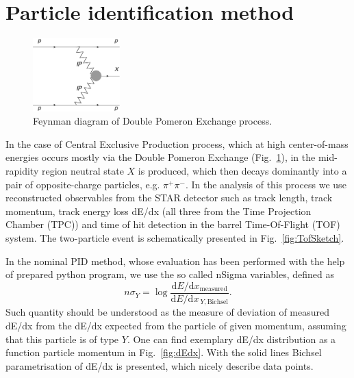 \documentclass[a4paper,11pt]{article}
\begin{document}
\section{Particle identification method}
\begin{figure}[ht]
  \centering
  \includegraphics[width=0.3\textwidth]{graphics/DPE.pdf}
  \caption{Feynman diagram of Double Pomeron Exchange process.}
   \label{fig:DPE}
\end{figure}

In the case of Central Exclusive Production process, which at high center-of-mass energies occurs mostly via the Double Pomeron Exchange (Fig.~\ref{fig:DPE}), in the mid-rapidity region neutral state $X$ is produced, which then decays dominantly into a pair of opposite-charge particles, e.g. $\pi^{+}\pi^{-}$. In the analysis of this process we use reconstructed observables from the STAR detector such as track length, track momentum, track energy loss dE/dx (all three from the Time Projection Chamber (TPC)) and time of hit detection in the barrel Time-Of-Flight (TOF) system. The two-particle event is schematically presented in Fig.~\ref{fig:TofSketch}.

In the nominal PID method, whose evaluation has been performed with the help of prepared python program, we use the so called nSigma variables, defined as
\begin{equation}
n\sigma_{Y} = \log{\frac{\textrm{d}E/\textrm{d}x_{\textrm{measured}}}{\textrm{d}E/\textrm{d}x_{~Y,\textrm{Bichsel}}}}.
\end{equation}
Such quantity should be understood as the measure of deviation of measured dE/dx from the dE/dx expected from the particle of given momentum, assuming that this particle is of type $Y$. One can find exemplary dE/dx distribution as a function particle momentum in Fig.~\ref{fig:dEdx}. With the solid lines Bichsel parametrisation of dE/dx is presented, which nicely describe data points.
\end{document}
